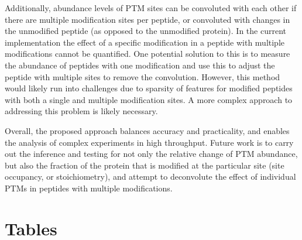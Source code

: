 \documentclass[mcp]{article}
\numberwithin{table}{section}
\begin{document}
Additionally, abundance levels of PTM sites can be convoluted with each other if there are multiple modification sites per peptide, or convoluted with changes in the unmodified peptide (as opposed to the unmodified protein). In the current implementation the effect of a specific modification in a peptide with multiple modifications cannot be quantified. One potential solution to this is to measure the abundance of peptides with one modification and use this to adjust the peptide with multiple sites to remove the convolution. However, this method would likely run into challenges due to sparsity of features for modified peptides with both a single and multiple modification sites. A more complex approach to addressing this problem is likely necessary.

Overall, the proposed approach balances accuracy and practicality, and enables the analysis of complex experiments in high throughput. Future work is to carry out the inference and testing for not only the relative change of PTM abundance, but also the fraction of the protein that is modified at the particular site (site occupancy, or stoichiometry), and attempt to deconvolute the effect of individual PTMs in peptides with multiple modifications.

\newpage
\printbibliography


\newpage
\section{Tables}
\end{document}
